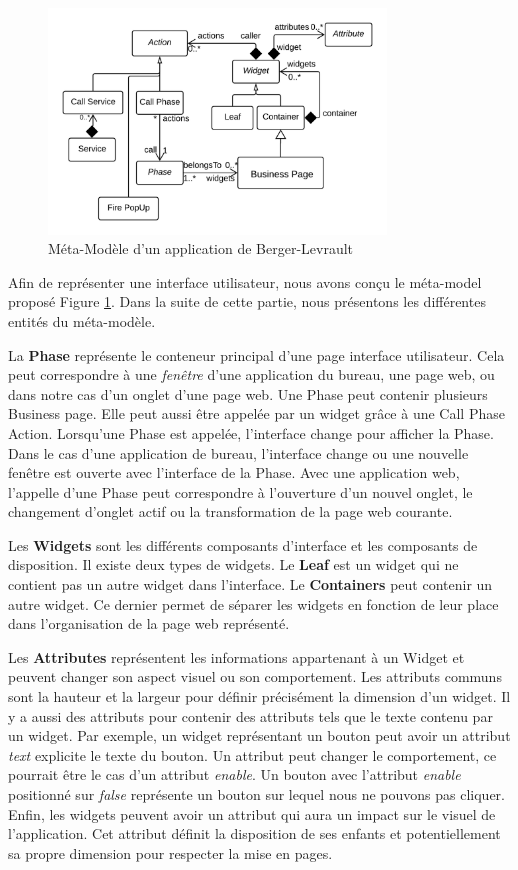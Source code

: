\documentclass[11pt,]{article}
\begin{document}
\hypertarget{guiModel}{%
\begin{figure}
\centering
\includegraphics[width=0.8\textwidth,height=\textheight]{figures/guiModel.png}
\caption{Méta-Modèle d'un application de
Berger-Levrault}\label{guiModel}
\end{figure}
}

Afin de représenter une interface utilisateur, nous avons conçu le
méta-model proposé Figure \ref{guiModel}. Dans la suite de cette partie,
nous présentons les différentes entités du méta-modèle.

La \textbf{Phase} représente le conteneur principal d'une page interface
utilisateur. Cela peut correspondre à une \emph{fenêtre} d'une
application du bureau, une page web, ou dans notre cas d'un onglet d'une
page web. Une Phase peut contenir plusieurs Business page. Elle peut
aussi être appelée par un widget grâce à une Call Phase Action.
Lorsqu'une Phase est appelée, l'interface change pour afficher la Phase.
Dans le cas d'une application de bureau, l'interface change ou une
nouvelle fenêtre est ouverte avec l'interface de la Phase. Avec une
application web, l'appelle d'une Phase peut correspondre à l'ouverture
d'un nouvel onglet, le changement d'onglet actif ou la transformation de
la page web courante.

Les \textbf{Widgets} sont les différents composants d'interface et les
composants de disposition. Il existe deux types de widgets. Le
\textbf{Leaf} est un widget qui ne contient pas un autre widget dans
l'interface. Le \textbf{Containers} peut contenir un autre widget. Ce
dernier permet de séparer les widgets en fonction de leur place dans
l'organisation de la page web représenté.

Les \textbf{Attributes} représentent les informations appartenant à un
Widget et peuvent changer son aspect visuel ou son comportement. Les
attributs communs sont la hauteur et la largeur pour définir précisément
la dimension d'un widget. Il y a aussi des attributs pour contenir des
attributs tels que le texte contenu par un widget. Par exemple, un
widget représentant un bouton peut avoir un attribut \emph{text}
explicite le texte du bouton. Un attribut peut changer le comportement,
ce pourrait être le cas d'un attribut \emph{enable}. Un bouton avec
l'attribut \emph{enable} positionné sur \emph{false} représente un
bouton sur lequel nous ne pouvons pas cliquer. Enfin, les widgets
peuvent avoir un attribut qui aura un impact sur le visuel de
l'application. Cet attribut définit la disposition de ses enfants et
potentiellement sa propre dimension pour respecter la mise en pages.
\end{document}
